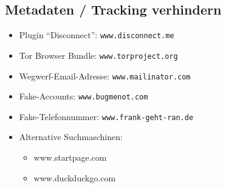 \subsection*{Metadaten / Tracking verhindern}
\begin{itemize}
  \item Plugin ``Disconnect'': \texttt{www.disconnect.me}
  
  \item Tor Browser Bundle: \texttt{www.torproject.org}
  \item Wegwerf-Email-Adresse: \texttt{www.mailinator.com}
  \item Fake-Accounts: \texttt{www.bugmenot.com}
  \item Fake-Telefonnummer: \texttt{www.frank-geht-ran.de}
  \item Alternative Suchmaschinen: 
    \begin{itemize}
      \item www.startpage.com 
      \item www.duckduckgo.com
    \end{itemize}
\end{itemize}
